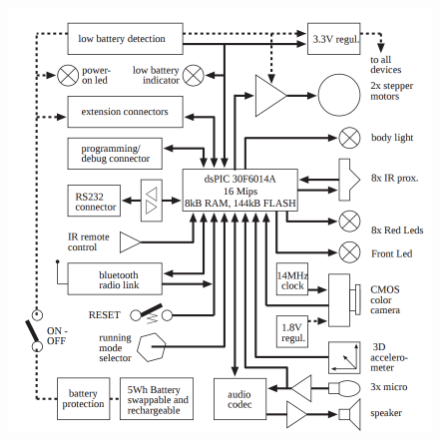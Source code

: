 \documentclass[a4paper,12pt]{report}
\begin{document}
\begin{figure}[!h]
	\begin{minipage}{.75\textwidth}
		\centering
		\includegraphics[width=1\linewidth]{electronics.png}
		\label{fig:epuck-elec}
	\end{minipage}
\end{figure}

\clearpage
\end{document}
